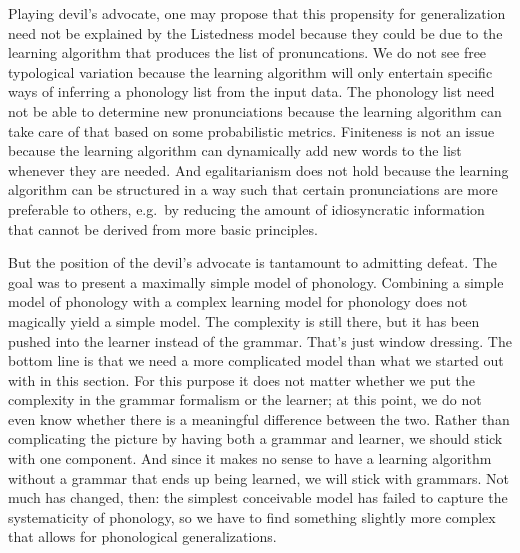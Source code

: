 Playing devil's advocate, one may propose that this propensity for generalization need not be explained by the Listedness model because they could be due to the learning algorithm that produces the list of pronuncations.
We do not see free typological variation because the learning algorithm will only entertain specific ways of inferring a phonology list from the input data.
The phonology list need not be able to determine new pronunciations because the learning algorithm can take care of that based on some probabilistic metrics.
Finiteness is not an issue because the learning algorithm can dynamically add new words to the list whenever they are needed.
And egalitarianism does not hold because the learning algorithm can be structured in a way such that certain pronunciations are more preferable to others, e.g.\ by reducing the amount of idiosyncratic information that cannot be derived from more basic principles.

But the position of the devil's advocate is tantamount to admitting defeat.
The goal was to present a maximally simple model of phonology.
Combining a simple model of phonology with a complex learning model for phonology does not magically yield a simple model.
The complexity is still there, but it has been pushed into the learner instead of the grammar.
That's just window dressing.
The bottom line is that we need a more complicated model than what we started out with in this section.
For this purpose it does not matter whether we put the complexity in the grammar formalism or the learner;
at this point, we do not even know whether there is a meaningful difference between the two.
Rather than complicating the picture by having both a grammar and learner, we should stick with one component.
And since it makes no sense to have a learning algorithm without a grammar that ends up being learned, we will stick with grammars.
Not much has changed, then: the simplest conceivable model has failed to capture the systematicity of phonology, so we have to find something slightly more complex that allows for phonological generalizations.


